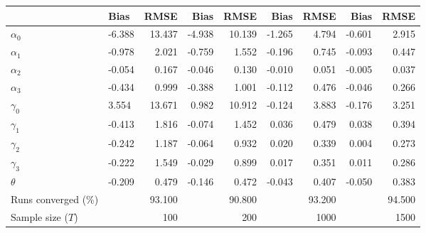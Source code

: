 
\begin{tabular}[t]{llrrrrrrr}
\toprule
  & Bias & RMSE & Bias & RMSE & Bias & RMSE & Bias & RMSE\\
\midrule
$\alpha_{0}$ & -6.388 & 13.437 & -4.938 & 10.139 & -1.265 & 4.794 & -0.601 & 2.915\\
$\alpha_{1}$ & -0.978 & 2.021 & -0.759 & 1.552 & -0.196 & 0.745 & -0.093 & 0.447\\
$\alpha_{2}$ & -0.054 & 0.167 & -0.046 & 0.130 & -0.010 & 0.051 & -0.005 & 0.037\\
$\alpha_{3}$ & -0.434 & 0.999 & -0.388 & 1.001 & -0.112 & 0.476 & -0.046 & 0.266\\
$\gamma_{0}$ & 3.554 & 13.671 & 0.982 & 10.912 & -0.124 & 3.883 & -0.176 & 3.251\\
$\gamma_{1}$ & -0.413 & 1.816 & -0.074 & 1.452 & 0.036 & 0.479 & 0.038 & 0.394\\
$\gamma_{2}$ & -0.242 & 1.187 & -0.064 & 0.932 & 0.020 & 0.339 & 0.004 & 0.273\\
$\gamma_{3}$ & -0.222 & 1.549 & -0.029 & 0.899 & 0.017 & 0.351 & 0.011 & 0.286\\
$\theta$ & -0.209 & 0.479 & -0.146 & 0.472 & -0.043 & 0.407 & -0.050 & 0.383\\
Runs converged (\%) &  & 93.100 &  & 90.800 &  & 93.200 &  & 94.500\\
Sample size ($T$) &  & 100 &  & 200 &  & 1000 &  & 1500\\
\bottomrule
\end{tabular}
